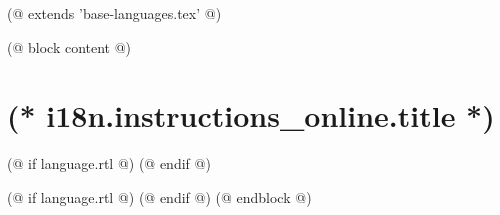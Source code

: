 (@ extends 'base-languages.tex' @)

(@ block content @)
    \pagestyle{instructions-online}
    \section{(* i18n.instructions_online.title *)}
    (@ if language.rtl @)
        \arabicfont\setRL
    (@ endif @)
    
    (@ if language.rtl @)
        \unsetRL
    (@ endif @)
(@ endblock @)
